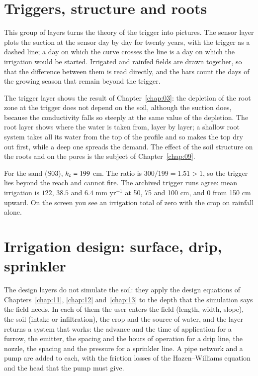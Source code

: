 \section{Triggers, structure and roots}
This group of layers turns the theory of the trigger into pictures. The sensor layer plots the suction at the sensor day by day for twenty years, with the trigger as a dashed line; a day on which the curve crosses the line is a day on which the irrigation would be started. Irrigated and rainfed fields are drawn together, so that the difference between them is read directly, and the bars count the days of the growing season that remain beyond the trigger.

The trigger layer shows the result of Chapter~\ref{chap:03}: the depletion of the root zone at the trigger does not depend on the soil, although the suction does, because the conductivity falls so steeply at the same value of the depletion. The root layer shows where the water is taken from, layer by layer; a shallow root system takes all its water from the top of the profile and so makes the top dry out first, while a deep one spreads the demand. The effect of the soil structure on the roots and on the pores is the subject of Chapter~\ref{chap:09}.

\sol  For the sand (S03), $h_{\mathrm c}=199$ cm. The ratio is $300/199=1.51>1$, so the trigger lies beyond the reach and cannot fire. The archived trigger runs agree: mean irrigation is $122$, $38.5$ and $6.4$ mm yr$^{-1}$ at 50, 75 and 100 cm, and $0$ from 150 cm upward. On the screen you see an irrigation total of zero with the crop on rainfall alone. \finans


\section{Irrigation design: surface, drip, sprinkler}
The design layers do not simulate the soil: they apply the design equations of Chapters~\ref{chap:11}, \ref{chap:12} and~\ref{chap:13} to the depth that the simulation says the field needs. In each of them the user enters the field (length, width, slope), the soil (intake or infiltration), the crop and the source of water, and the layer returns a system that works: the advance and the time of application for a furrow, the emitter, the spacing and the hours of operation for a drip line, the nozzle, the spacing and the pressure for a sprinkler line. A pipe network and a pump are added to each, with the friction losses of the Hazen--Williams equation and the head that the pump must give.

